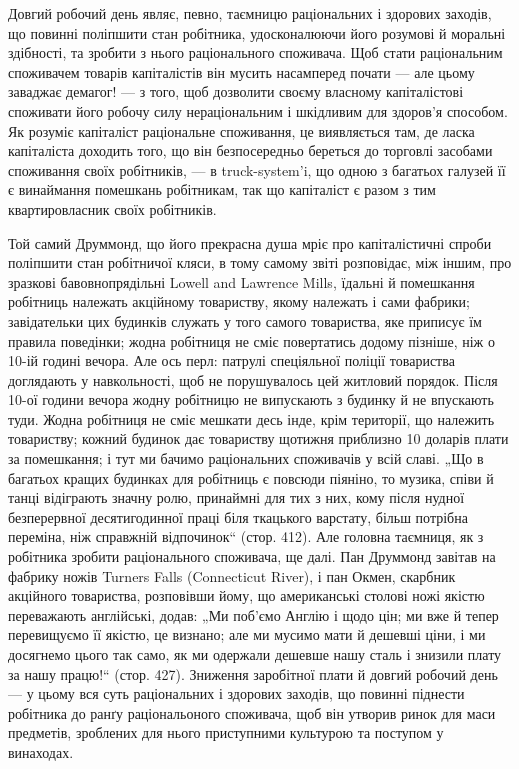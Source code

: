 Довгий робочий день являє, певно, таємницю раціональних і здорових
заходів, що повинні поліпшити стан робітника, удосконалюючи його розумові
й моральні здібності, та зробити з нього раціонального споживача.
Щоб стати раціональним споживачем товарів капіталістів він мусить
насамперед почати — але цьому заваджає демагог! — з того, щоб дозволити
своєму власному капіталістові споживати його робочу силу
нераціональним і шкідливим для здоров’я способом. Як розуміє
капіталіст раціональне споживання, це виявляється там, де ласка капіталіста
доходить того, що він безпосередньо береться до торговлі
засобами споживання своїх робітників, — в truck-system’i, що одною з
багатьох галузей її є винаймання помешкань робітникам, так що капіталіст
є разом з тим квартировласник своїх робітників.

Той самий Друммонд, що його прекрасна душа мріє про капіталістичні
спроби поліпшити стан робітничої кляси, в тому самому звіті розповідає,
між іншим, про зразкові бавовнопрядільні Lowell and Lawrence Mills,
їдальні й помешкання робітниць належать акційному товариству, якому
належать і сами фабрики; завідательки цих будинків служать у того
самого товариства, яке приписує їм правила поведінки; жодна робітниця
не сміє повертатись додому пізніше, ніж о 10-ій годині вечора. Але
ось перл: патрулі спеціяльної поліції товариства доглядають у навкольності,
щоб не порушувалось цей житловий порядок. Після 10-ої години
вечора жодну робітницю не випускають з будинку й не впускають туди.
Жодна робітниця не сміє мешкати десь інде, крім території, що належить
товариству; кожний будинок дає товариству щотижня приблизно 10 доларів
плати за помешкання; і тут ми бачимо раціональних споживачів у всій
славі. „Що в багатьох кращих будинках для робітниць є повсюди піяніно,
то музика, співи й танці відіграють значну ролю, принаймні для тих з
них, кому після нудної безперервної десятигодинної праці біля ткацького
варстату, більш потрібна переміна, ніж справжній відпочинок“ (стор. 412).
Але головна таємниця, як з робітника зробити раціонального споживача,
ще далі. Пан Друммонд завітав на фабрику ножів Turners Falls (Connecticut
River), і пан Окмен, скарбник акційного товариства, розповівши
йому, що американські столові ножі якістю переважають англійські, додав:
„Ми поб’ємо Англію і щодо цін; ми вже й тепер перевищуємо її якістю,
це визнано; але ми мусимо мати й дешевші ціни, і ми досягнемо цього
так само, як ми одержали дешевше нашу сталь і знизили плату за нашу
працю!“ (стор. 427). Зниження заробітної плати й довгий робочий день —
у цьому вся суть раціональних і здорових заходів, що повинні піднести
робітника до ранґу раціональоного споживача, щоб він утворив ринок
для маси предметів, зроблених для нього приступними культурою та поступом
у винаходах.

